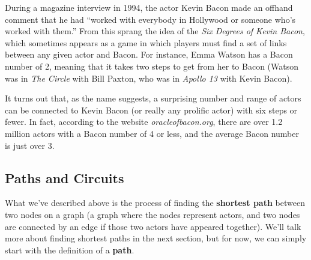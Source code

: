 \setcounter{ExampleCounter}{1}
During a magazine interview in 1994, the actor Kevin Bacon made an offhand comment that he had ``worked with everybody in Hollywood or someone who's worked with them.''  From this sprang the idea of the \emph{Six Degrees of Kevin Bacon}, which sometimes appears as a game in which players must find a set of links between any given actor and Bacon.  For instance, Emma Watson has a Bacon number of 2, meaning that it takes two steps to get from her to Bacon (Watson was in \emph{The Circle} with Bill Paxton, who was in \emph{Apollo 13} with Kevin Bacon).

It turns out that, as the name suggests, a surprising number and range of actors can be connected to Kevin Bacon (or really any prolific actor) with six steps or fewer.  In fact, according to the website \emph{oracleofbacon.org}, there are over 1.2 million actors with a Bacon number of 4 or less, and the average Bacon number is just over 3.

\subsection{Paths and Circuits}

What we've described above is the process of finding the \textbf{shortest path} between two nodes on a graph (a graph where the nodes represent actors, and two nodes are connected by an edge if those two actors have appeared together).  We'll talk more about finding shortest paths in the next section, but for now, we can simply start with the definition of a \textbf{path}.

